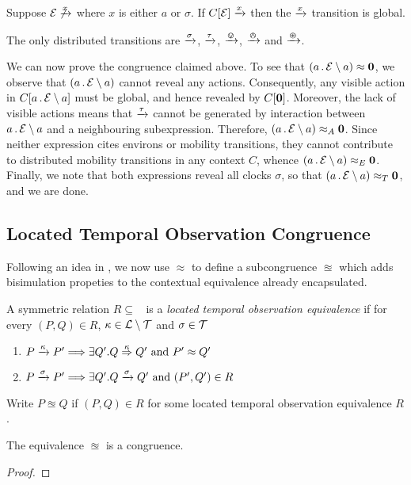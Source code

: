 \documentclass[orivec,envcountsame]{llncs}
\newcommand{\Eq}{\approx}
\newcommand{\EqA}{\mathrel{\Eq_{A}}}
\newcommand{\EqT}{\mathrel{\Eq_{T}}}
\newcommand{\EqE}{\mathrel{\Eq_{E}}}
\newcommand{\LTOC}{\approxeq}
\newcommand{\Does}[1]{\xderives{#1}}
\newcommand{\Weak}[1]{\stackrel{#1}{\Rightarrow}}
\begin{document}
\begin{proposition}
Suppose $\expr \not\Does{x}$ where $x$ is either $a$ or $\sigma$. If
$C[\expr] \Does{x}$ then the $\Does{x}$ transition is global.
\end{proposition}

\begin{proposition}
The only distributed transitions are $\Does{\sigma}$, $\Does{\tau}$,
$\Does{\tin}$, $\Does{\tout}$ and $\Does{\topen}$.
\end{proposition}

We can now prove the congruence claimed above. To see that
$\left(a\pref\expr \res{a}\right) \Eq \nil$, we observe that
$\left(a\,.\,\text{$\mathcal{E}$} \setminus {a}\right)$ cannot reveal any
actions. Consequently, any visible action in $C[a\,.\,\text{$\mathcal{E}$} \setminus {a}]$
must be global, and hence revealed by $C[\textbf{0}]$. Moreover, the lack of
visible actions means that $\Does{\tau}$ cannot be generated by
interaction between $a\,.\,\text{$\mathcal{E}$} \setminus {a}$ and a neighbouring
subexpression. Therefore, $\left(a\pref\expr \res{a}\right) \EqA
\nil$. Since neither expression cites environs or mobility transitions,
they cannot contribute to distributed mobility transitions in any
context $C$, whence $\left(a\pref\expr \res{a}\right) \EqE
\nil$. Finally, we note that both expressions reveal all clocks
$\sigma$, so that $\left(a\pref\expr \res{a}\right) \EqT \nil$, and we
are done.


\subsection{Located Temporal Observation Congruence}
\label{sec:ltoc}

Following an idea in \cite{case}, we now use $\Eq$ to define a subcongruence
$\LTOC$ which adds bisimulation propeties to the contextual equivalence already
encapsulated.

\begin{definition}
A symmetric relation $R\mathrel{\subseteq}\mathop{\EqE}$ is a \emph{located temporal
observation equivalence} if for every $(P,Q) \in R$, $\kappa \in \text{$\mathcal{L}$} \setminus
\text{$\mathcal{T}$}$ and $\sigma \in \text{$\mathcal{T}$}$
\begin{enumerate}
\item
    $P \Does{\kappa} P' \Longrightarrow 
       \exists Q' . Q \Weak{\kappa} Q' \mbox{ and } P' \Eq Q'$
\item
    $P \Does{\sigma} P' \Longrightarrow
       \exists Q' . Q \Does{\sigma} Q' \mbox{ and } (P', Q') \in R$
\end{enumerate}
Write $P \LTOC Q$ if $(P,Q) \in R$ for some located temporal observation
equivalence $R$.
\end{definition}

\begin{lemma}
The equivalence $\LTOC$ is a congruence.
\end{lemma}
\begin{proof}

\end{proof}



\end{document}
